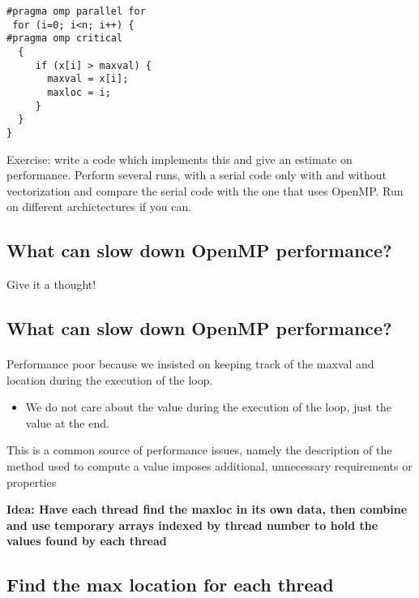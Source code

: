 \begin{verbatim}
#pragma omp parallel for
 for (i=0; i<n; i++) {
#pragma omp critical
  {
     if (x[i] > maxval) {
       maxval = x[i];
       maxloc = i; 
     }
  }
} 

\end{verbatim}


Exercise: write a code which implements this and give an estimate on performance. Perform several runs,
with a serial code only with and without vectorization and compare the serial code with the one that  uses OpenMP. Run on different archictectures if you can.



\subsection*{What can slow down OpenMP performance?}
Give it a thought!

\subsection*{What can slow down OpenMP performance?}

\paragraph{}
Performance poor because we insisted on keeping track of the maxval and location during the execution of the loop.
\begin{itemize}
 \item We do not care about the value during the execution of the loop, just the value at the end.
\end{itemize}

\noindent
This is a common source of performance issues, namely the description of the method used to compute a value imposes additional, unnecessary requirements or properties

\textbf{Idea: Have each thread find the maxloc in its own data, then combine and use temporary arrays indexed by thread number to hold the values found by each thread}



\subsection*{Find the max location for each thread}

